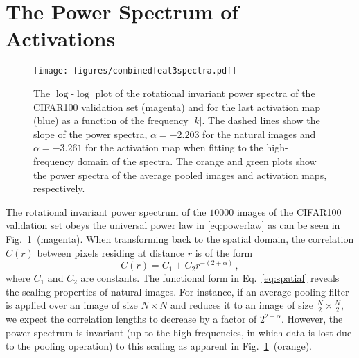 \documentclass{article}
\begin{document}
\section{The Power Spectrum of Activations}
\begin{figure}[t]
\begin{center}
   \texttt{[image: figures/combinedfeat3spectra.pdf]}
   \caption{The $\log$-$\log$ plot of the rotational invariant power spectra of the CIFAR100 validation set (magenta) and for the last activation map (blue) as a function of the frequency $\left \vert k \right \vert$. The dashed lines show the slope of the power spectra, $\alpha=-2.203$ for the natural images and $\alpha=-3.261$ for the activation map when fitting to the high-frequency domain of the spectra. The orange and green plots show the power spectra of the average pooled images and activation maps, respectively.}
\label{fig:cifar100powerspectra}
\end{center}
\end{figure}


The rotational invariant power spectrum of the $10000$ images of the CIFAR100~\cite{krizhevsky2009learning} validation set obeys the universal power law in \eqref{eq:powerlaw} as can be seen in Fig.~\ref{fig:cifar100powerspectra}~(magenta).  When transforming back to the spatial domain, the correlation $C\left(r\right)$ between pixels residing at distance $r$ is of the form~\cite{ruderman1997origins}
\begin{equation}
	C\left(r \right) =C_1 + C_2 r^{-\left( 2 + \alpha \right)} \,,
    \label{eq:spatial}
\end{equation}where $C_1$ and $C_2$ are constants. The functional form in Eq.~\eqref{eq:spatial} reveals the scaling properties of natural images. For instance, if an average pooling filter is applied over an image of size $N\times N$ and reduces it to an image of size $\frac{N}{2} \times \frac{N}{2}$, we expect the correlation lengths to decrease by a factor of $2^{2+\alpha}$. However, the power spectrum is invariant (up to the high frequencies, in which data is lost due to the pooling operation) to this scaling as apparent in Fig.~\ref{fig:cifar100powerspectra}~(orange).  
\end{document}
